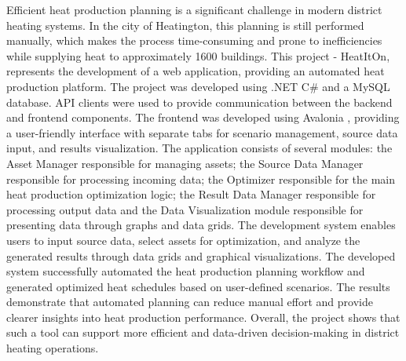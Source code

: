 \thispagestyle{plain}
\hspace*{1cm} Efficient heat production planning is a significant challenge in modern district heating systems. In the city of Heatington, this planning is still performed manually, which makes the process time-consuming and prone to inefficiencies while supplying heat to approximately 1600 buildings. This project - HeatItOn, represents the development of a web application, providing an automated heat production platform. The project was developed using .NET C\# and a MySQL database. API clients were used to provide communication between the backend and frontend components. The frontend was developed using Avalonia \cite{avalonia}, providing a user-friendly interface with separate tabs for scenario management, source data input, and results visualization. The application consists of several modules: the Asset Manager responsible for managing assets; the Source Data Manager responsible for processing incoming data; the Optimizer responsible for the main heat production optimization logic; the Result Data Manager responsible for processing output data and the Data Visualization module responsible for presenting data through graphs and data grids. The development system enables users to input source data, select assets for optimization, and analyze the generated results through data grids and graphical visualizations. The developed system successfully automated the heat production planning workflow and generated optimized heat schedules based on user-defined scenarios. The results demonstrate that automated planning can reduce manual effort and provide clearer insights into heat production performance. Overall, the project shows that such a tool can support more efficient and data-driven decision-making in district heating operations.

